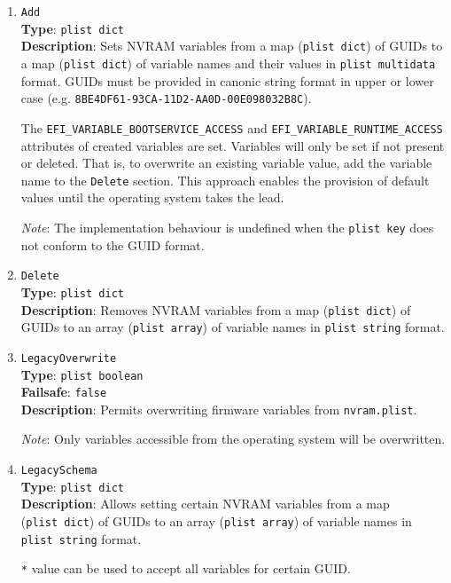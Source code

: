 \documentclass[]{article}
\begin{document}
\begin{enumerate}
\item
  \texttt{Add}\\
  \textbf{Type}: \texttt{plist\ dict}\\
  \textbf{Description}: Sets NVRAM variables from a map (\texttt{plist\ dict})
  of GUIDs to a map (\texttt{plist\ dict}) of variable names and their values
  in \texttt{plist\ multidata} format. GUIDs must be provided in canonic string
  format in upper or lower case (e.g. \texttt{8BE4DF61-93CA-11D2-AA0D-00E098032B8C}).

  The \texttt{EFI\_VARIABLE\_BOOTSERVICE\_ACCESS} and \texttt{EFI\_VARIABLE\_RUNTIME\_ACCESS}
  attributes of created variables are set. Variables will only be set if not present or deleted.
  That is, to overwrite an existing variable value, add the variable name to the \texttt{Delete} section.
  This approach enables the provision of default values until the operating system takes the lead.

  \emph{Note}: The implementation behaviour is undefined when the \texttt{plist\ key}
  does not conform to the GUID format.

\item
  \texttt{Delete}\\
  \textbf{Type}: \texttt{plist\ dict}\\
  \textbf{Description}: Removes NVRAM variables from a map (\texttt{plist\ dict})
  of GUIDs to an array (\texttt{plist\ array}) of variable names in
  \texttt{plist\ string} format.

\item
  \texttt{LegacyOverwrite}\\
  \textbf{Type}: \texttt{plist\ boolean}\\
  \textbf{Failsafe}: \texttt{false}\\
  \textbf{Description}: Permits overwriting firmware variables from \texttt{nvram.plist}.

  \emph{Note}: Only variables accessible from the operating system will be overwritten.

\item
  \texttt{LegacySchema}\\
  \textbf{Type}: \texttt{plist\ dict}\\
  \textbf{Description}: Allows setting certain NVRAM variables from a map
  (\texttt{plist\ dict}) of GUIDs to an array (\texttt{plist\ array}) of
  variable names in \texttt{plist\ string} format.

  \texttt{*} value can be used to accept all variables for certain GUID.


\end{enumerate}
\end{document}
